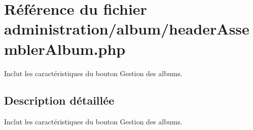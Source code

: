 \hypertarget{headerAssemblerAlbum_8php}{}\section{Référence du fichier administration/album/header\+Assembler\+Album.php}
\label{headerAssemblerAlbum_8php}


Inclut les caractéristiques du bouton Gestion des albums.  




\subsection{Description détaillée}
Inclut les caractéristiques du bouton Gestion des albums. 

